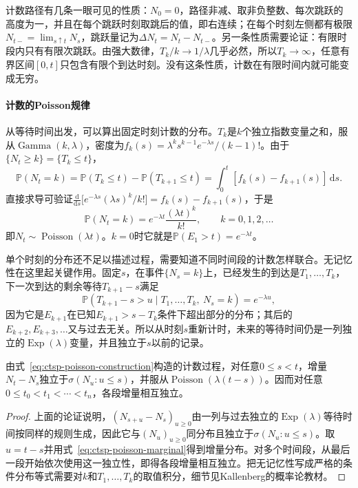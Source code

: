 计数路径有几条一眼可见的性质：$N_0=0$，路径非减、取非负整数、每次跳跃的高度为一，并且在每个跳跃时刻取跳后的值，即右连续；在每个时刻左侧都有极限$N_{t-}=\lim_{s\uparrow t}N_s$，跳跃量记为$\Delta N_t=N_t-N_{t-}$。另一条性质需要论证：有限时段内只有有限次跳跃。由强大数律，$T_k/k\to1/\lambda$几乎必然，所以$T_k\to\infty$，任意有界区间$[0,t]$只包含有限个到达时刻。没有这条性质，计数在有限时间内就可能变成无穷。

\paragraph{计数的Poisson规律}
从等待时间出发，可以算出固定时刻计数的分布。$T_k$是$k$个独立指数变量之和，服从$\operatorname{Gamma}(k,\lambda)$，密度为$f_k(s)=\lambda^ks^{k-1}e^{-\lambda s}/(k-1)!$。由于$\{N_t\geq k\}=\{T_k\leq t\}$，
\[
  \mathbb P(N_t=k)=\mathbb P(T_k\leq t)-\mathbb P(T_{k+1}\leq t)
  =\int_0^t[f_k(s)-f_{k+1}(s)]\,\mathrm ds .
\]
直接求导可验证$\frac{\mathrm d}{\mathrm ds}\bigl[e^{-\lambda s}(\lambda s)^k/k!\bigr]=f_k(s)-f_{k+1}(s)$，于是
\begin{equation}
  \mathbb P(N_t=k)=e^{-\lambda t}\frac{(\lambda t)^k}{k!},\qquad k=0,1,2,\ldots
  \label{eq:ctsp-poisson-marginal}
\end{equation}
即$N_t\sim\operatorname{Poisson}(\lambda t)$。$k=0$时它就是$\mathbb P(E_1>t)=e^{-\lambda t}$。

单个时刻的分布还不足以描述过程，需要知道不同时间段的计数怎样联合。无记忆性在这里起关键作用。固定$s$，在事件$\{N_s=k\}$上，已经发生的到达是$T_1,\ldots,T_k$，下一次到达的剩余等待$T_{k+1}-s$满足
\[
  \mathbb P(T_{k+1}-s>u\mid T_1,\ldots,T_k,\ N_s=k)=e^{-\lambda u},
\]
因为它是$E_{k+1}$在已知$E_{k+1}>s-T_k$条件下超出部分的分布；其后的$E_{k+2},E_{k+3},\ldots$又与过去无关。所以从时刻$s$重新计时，未来的等待时间仍是一列独立的$\operatorname{Exp}(\lambda)$变量，并且独立于$s$以前的记录。

\begin{theorem}[Poisson过程的增量]
  \label{thm:ctsp-poisson-increments}
  由式~\eqref{eq:ctsp-poisson-construction}构造的计数过程，对任意$0\leq s<t$，增量$N_t-N_s$独立于$\sigma(N_u:u\leq s)$，并服从$\operatorname{Poisson}(\lambda(t-s))$。因而对任意$0\leq t_0<t_1<\cdots<t_n$，各段增量相互独立。
\end{theorem}

\begin{proof}
上面的论证说明，$(N_{s+u}-N_s)_{u\geq0}$由一列与过去独立的$\operatorname{Exp}(\lambda)$等待时间按同样的规则生成，因此它与$(N_u)_{u\geq0}$同分布且独立于$\sigma(N_u:u\leq s)$。取$u=t-s$并用式~\eqref{eq:ctsp-poisson-marginal}得到增量分布。对多个时间段，从最后一段开始依次使用这一独立性，即得各段增量相互独立。把无记忆性写成严格的条件分布等式需要对$k$和$T_1,\ldots,T_k$的取值积分，细节见Kallenberg的概率论教材。
\end{proof}

